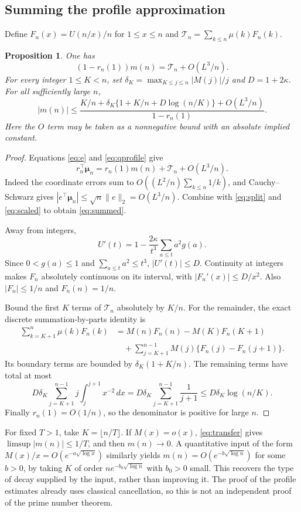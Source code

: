 \documentclass[11pt]{article}
\newtheorem{proposition}[theorem]{Proposition}
\theoremstyle{remark}\newtheorem{remark}[theorem]{Remark}
\newcommand{\muvec}{\boldsymbol\mu}
\begin{document}
\subsection{Summing the profile approximation}
Define $F_n(x)=U(n/x)/n$ for $1\le x\le n$ and
$\mathcal T_n=\sum_{k\le n}\mu(k)F_n(k)$.
\begin{proposition}\label{prop:transfer}
One has
\begin{equation}\label{eq:summed}
 (1-r_n(1))m(n)=\mathcal T_n+O(L^3/n).
\end{equation}
For every integer $1\le K<n$, set
$\delta_K=\max_{K\le j\le n}|M(j)|/j$ and $D=1+2\kappa$. For all sufficiently large $n$,
\begin{equation}\label{eq:transfer}
 |m(n)|\le
 \frac{K/n+\delta_K\{1+K/n+D\log(n/K)\}+O(L^3/n)}{1-r_n(1)}.
\end{equation}
Here the $O$ term may be taken as a nonnegative bound with an absolute implied constant.
\end{proposition}
\begin{proof}
Equations \eqref{eq:e} and \eqref{eq:qprofile} give
\[
 r_n^\top\muvec_n=r_n(1)m(n)+\mathcal T_n+O(L^3/n).
\]
Indeed the coordinate errors sum to $O((L^2/n)\sum_{k\le n}1/k)$, and Cauchy--Schwarz gives $|e^\top\muvec_n|\le\sqrt n\|e\|_2=O(L^3/n)$. Combine with \eqref{eq:split} and \eqref{eq:scaled} to obtain \eqref{eq:summed}.

Away from integers,
\[
 U'(t)=1-\frac{2\kappa}{t^3}\sum_{a\le t}a^2g(a).
\]
Since $0<g(a)\le1$ and $\sum_{a\le t}a^2\le t^3$, $|U'(t)|\le D$. Continuity at integers makes $F_n$ absolutely continuous on its interval, with $|F_n'(x)|\le D/x^2$. Also $|F_n|\le1/n$ and $F_n(n)=1/n$.

Bound the first $K$ terms of $\mathcal T_n$ absolutely by $K/n$. For the remainder, the exact discrete summation-by-parts identity is
\begin{align*}
 \sum_{k=K+1}^n\mu(k)F_n(k)
 &=M(n)F_n(n)-M(K)F_n(K+1)\\
 &\quad+\sum_{j=K+1}^{n-1}M(j)\{F_n(j)-F_n(j+1)\}.
\end{align*}
Its boundary terms are bounded by $\delta_K(1+K/n)$. The remaining terms have total at most
\[
 D\delta_K\sum_{j=K+1}^{n-1}j\int_j^{j+1}x^{-2}\,dx
 =D\delta_K\sum_{j=K+1}^{n-1}\frac1{j+1}
 \le D\delta_K\log(n/K).
\]
Finally $r_n(1)=O(1/n)$, so the denominator is positive for large $n$.
\end{proof}
For fixed $T>1$, take $K=\lfloor n/T\rfloor$. If $M(x)=o(x)$, \eqref{eq:transfer} gives $\limsup|m(n)|\le1/T$, and then $m(n)\to0$. A quantitative input of the form $M(x)/x=O(e^{-a\sqrt{\log x}})$ similarly yields $m(n)=O(e^{-b\sqrt{\log n}})$ for some $b>0$, by taking $K$ of order $n e^{-b_0\sqrt{\log n}}$ with $b_0>0$ small. This recovers the type of decay supplied by the input, rather than improving it. The proof of the profile estimates already uses classical cancellation, so this is not an independent proof of the prime number theorem.
\end{document}
